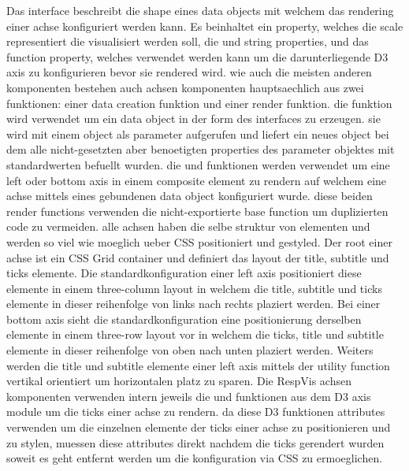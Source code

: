 Das  interface beschreibt die shape eines data objects mit welchem das rendering einer achse konfiguriert werden kann.
Es beinhaltet ein  property, welches die scale representiert die visualisiert werden soll, die  und  string properties, und das  function property, welches verwendet werden kann um die darunterliegende D3 axis zu konfigurieren bevor sie rendered wird.  
wie auch die meisten anderen komponenten bestehen auch achsen komponenten hauptsaechlich aus zwei funktionen: einer data creation funktion und einer render funktion.
die  funktion wird verwendet um ein data object in der form des  interfaces zu erzeugen.
sie wird mit einem  object als parameter aufgerufen und liefert ein neues object bei dem alle nicht-gesetzten aber benoetigten properties des parameter objektes mit standardwerten befuellt wurden.
die  und  funktionen werden verwendet um eine left oder bottom axis in einem composite element zu rendern auf welchem eine achse mittels eines gebundenen  data object konfiguriert wurde. 
diese beiden render functions verwenden die nicht-exportierte  base function um duplizierten code zu vermeiden.
alle achsen haben die selbe struktur von elementen und werden so viel wie moeglich ueber CSS positioniert und gestyled.
Der root einer achse ist ein CSS Grid container und definiert das layout der title, subtitle und ticks elemente.
Die standardkonfiguration einer left axis positioniert diese elemente in einem three-column layout in welchem die title, subtitle und ticks elemente in dieser reihenfolge von links nach rechts plaziert werden.
Bei einer bottom axis sieht die standardkonfiguration eine positionierung derselben elemente in einem three-row layout vor in welchem die ticks, title und subtitle elemente in dieser reihenfolge von oben nach unten plaziert werden.
Weiters werden die title und subtitle elemente einer left axis mittels der  utility function vertikal orientiert um horizontalen platz zu sparen.
Die RespVis achsen komponenten verwenden intern jeweils die  und  funktionen aus dem D3 axis module \parencite{D3Axis} um die ticks einer achse zu rendern.
da diese D3 funktionen attributes verwenden um die einzelnen elemente der ticks einer achse zu positionieren und zu stylen, muessen diese attributes direkt nachdem die ticks gerendert wurden soweit es geht entfernt werden um die konfiguration via CSS zu ermoeglichen. 

